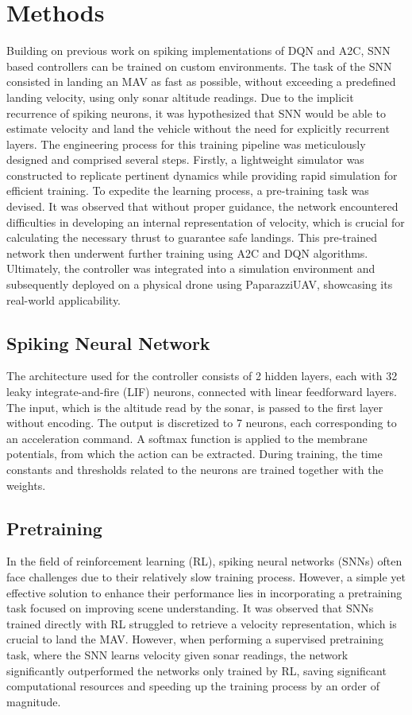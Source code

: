 \section{Methods}
\label{section:methods}
Building on previous work on spiking implementations of DQN and A2C, SNN based controllers can be trained on custom environments. The task of the SNN consisted in landing an MAV as fast as possible, without exceeding a predefined landing velocity, using only sonar altitude readings. Due to the implicit recurrence of spiking neurons, it was hypothesized that SNN would be able to estimate velocity and land the vehicle without the need for explicitly recurrent layers. The engineering process for this training pipeline was meticulously designed and comprised several steps. Firstly, a lightweight simulator was constructed to replicate pertinent dynamics while providing rapid simulation for efficient training. To expedite the learning process, a pre-training task was devised. It was observed that without proper guidance, the network encountered difficulties in developing an internal representation of velocity, which is crucial for calculating the necessary thrust to guarantee safe landings. This pre-trained network then underwent further training using A2C and DQN algorithms. Ultimately, the controller was integrated into a simulation environment and subsequently deployed on a physical drone using PaparazziUAV, showcasing its real-world applicability.
 \subsection{Spiking Neural Network}
 The architecture used for the controller consists of 2 hidden layers, each with 32 leaky integrate-and-fire (LIF) neurons, connected with linear feedforward layers. The input, which is the altitude read by the sonar, is passed to the first layer without encoding. The output is discretized to 7 neurons, each corresponding to an acceleration command. A softmax function is applied to the membrane potentials, from which the action can be extracted. During training, the time constants and thresholds related to the neurons are trained together with the weights.
 
\subsection{Pretraining}
In the field of reinforcement learning (RL), spiking neural networks (SNNs) often face challenges due to their relatively slow training process. However, a simple yet effective solution to enhance their performance lies in incorporating a pretraining task focused on improving scene understanding. It was observed that SNNs trained directly with RL struggled to retrieve a velocity representation, which is crucial to land the MAV. However, when performing a supervised pretraining task, where the SNN learns velocity given sonar readings, the network significantly outperformed the networks only trained by RL, saving significant computational resources and speeding up the training process by an order of magnitude.


